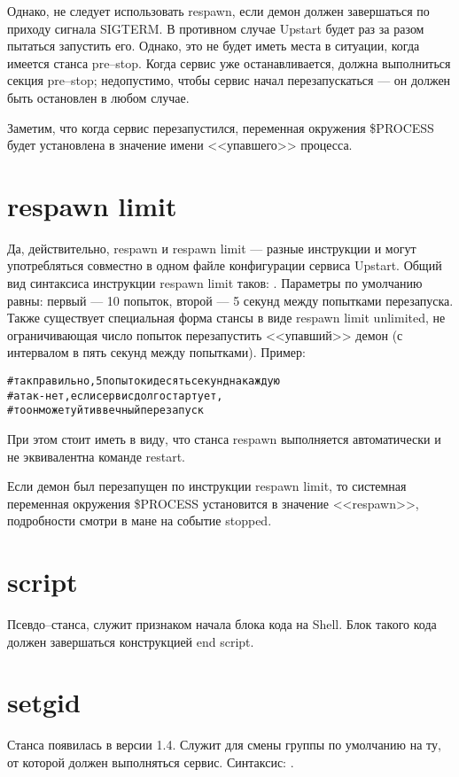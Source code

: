 Однако, не следует использовать respawn, если демон должен завершаться по приходу сигнала SIGTERM. В противном случае Upstart будет раз за разом пытаться запустить его. Однако, это не будет иметь места в ситуации, когда имеется станса pre--stop. Когда сервис уже останавливается, должна выполниться секция pre--stop; недопустимо, чтобы сервис начал перезапускаться --- он должен быть остановлен в любом случае.

Заметим, что когда сервис перезапустился, переменная окружения \$PROCESS будет установлена в значение имени <<упавшего>> процесса.
\section{respawn limit} \label{sec:RespawnLimit}
Да, действительно, respawn и respawn limit --- разные инструкции и могут употребляться совместно в одном файле конфигурации сервиса Upstart. Общий вид синтаксиса инструкции respawn limit таков: . Параметры по умолчанию равны: первый --- 10 попыток, второй --- 5 секунд между попытками перезапуска. Также существует специальная форма стансы в виде respawn limit unlimited, не ограничивающая число попыток перезапустить <<упавший>> демон (с интервалом в пять секунд между попытками). Пример: \begin{alltt}
 #так правильно, 5 попыток и десять секунд на каждую
 #а так - нет, если сервис долго стартует, 
							#то он может уйти в вечный перезапуск
\end{alltt}    
При этом стоит иметь в виду, что станса respawn выполняется автоматически и не эквивалентна команде restart.

Если демон был перезапущен по инструкции respawn limit, то системная переменная окружения \$PROCESS установится в значение <<respawn>>, подробности смотри в мане на событие stopped. 
\section{script} \label{sec:Script}
Псевдо--станса, служит признаком начала блока кода на Shell. Блок такого кода должен завершаться конструкцией end script.
\section{setgid} \label{sec:Setgid}
Станса появилась в версии 1.4. Служит для смены группы по умолчанию на ту, от которой должен выполняться сервис. Синтаксис: . 

